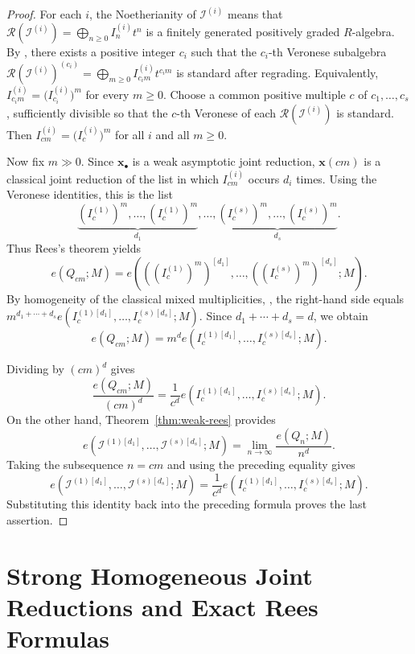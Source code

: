 \documentclass[reqno,12pt]{amsart}
\theoremstyle{plain}
\theoremstyle{definition}
\theoremstyle{remark}
\numberwithin{equation}{section}
\begin{document}
\begin{proof}
For each $i$, the Noetherianity of $\mathcal I^{(i)}$ means that $\mathcal R(\mathcal I^{(i)})
=
\bigoplus_{n\geq0}I_n^{(i)}t^n$
is a finitely generated positively graded $R$-algebra. By
\cite[Theorem~2.1]{HerzogHibiTrung}, there exists a positive integer
$c_i$ such that the $c_i$-th Veronese subalgebra $\mathcal R(\mathcal I^{(i)})^{(c_i)}
=
\bigoplus_{m\geq0}
I_{c_im}^{(i)}t^{c_im}$
is standard after regrading. Equivalently, $I_{c_im}^{(i)}
=
\bigl(I_{c_i}^{(i)}\bigr)^m$
for every $m\geq0$. Choose a common positive multiple $c$ of $c_1,\ldots,c_s$, sufficiently
divisible so that the $c$-th Veronese of each
$\mathcal R(\mathcal I^{(i)})$ is standard. Then $I_{cm}^{(i)}
=
\bigl(I_c^{(i)}\bigr)^m$
for all $i$ and all $m\geq0$.

Now fix $m\gg0$. Since $\mathbf x_\bullet$ is a weak asymptotic joint
reduction, $\mathbf x(cm)$ is a classical joint reduction of the list
in which $I_{cm}^{(i)}$ occurs $d_i$ times. Using the Veronese
identities, this is the list
\[
\underbrace{(I_c^{(1)})^m,\ldots,(I_c^{(1)})^m}_{d_1},
\ldots,
\underbrace{(I_c^{(s)})^m,\ldots,(I_c^{(s)})^m}_{d_s}.
\]
Thus Rees's theorem
\cite[Theorem~17.4.9]{SwansonHuneke} yields
\[
e(Q_{cm};M)
=
e\!\left(
((I_c^{(1)})^m)^{[d_1]},\ldots,
((I_c^{(s)})^m)^{[d_s]};M
\right).
\]
By homogeneity of the classical mixed multiplicities,
\cite[Theorem~17.4.2 and Definition~17.4.3]{SwansonHuneke},
the right-hand side equals $m^{d_1+\cdots+d_s}
e\!\left(
I_c^{(1)[d_1]},\ldots,
I_c^{(s)[d_s]};M
\right).$
Since $d_1+\cdots+d_s=d$, we obtain
\[
e(Q_{cm};M)
=
m^d
e\!\left(
I_c^{(1)[d_1]},\ldots,
I_c^{(s)[d_s]};M
\right).
\]

Dividing by $(cm)^d$ gives
\[
\frac{e(Q_{cm};M)}{(cm)^d}
=
\frac{1}{c^d}
e\!\left(
I_c^{(1)[d_1]},\ldots,
I_c^{(s)[d_s]};M
\right).
\]
On the other hand, Theorem~\ref{thm:weak-rees} provides
\[
e\!\left(
\mathcal I^{(1)[d_1]},\ldots,
\mathcal I^{(s)[d_s]};M
\right)
=
\lim_{n\to\infty}\frac{e(Q_n;M)}{n^d}.
\]
Taking the subsequence $n=cm$ and using the preceding equality gives
\[
e\!\left(
\mathcal I^{(1)[d_1]},\ldots,
\mathcal I^{(s)[d_s]};M
\right)
=
\frac{1}{c^d}
e\!\left(
I_c^{(1)[d_1]},\ldots,
I_c^{(s)[d_s]};M
\right).
\]
Substituting this identity back into the preceding formula proves the
last assertion.
\end{proof}



\section{Strong Homogeneous Joint Reductions and Exact Rees Formulas}
\label{sec:strong}
\end{document}
